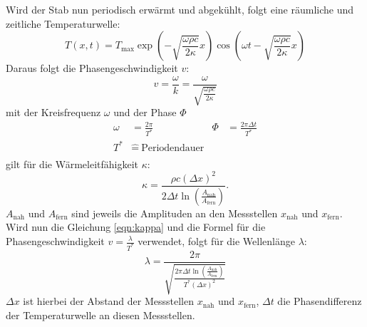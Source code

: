 Wird der Stab nun periodisch erwärmt und abgekühlt, folgt eine räumliche und zeitliche Temperaturwelle:
\begin{equation*}\label{eqn:Tempwelle}
    T(x,t) = T_\text{max} \exp(-\sqrt{\frac{\omega \rho c}{2\kappa}}x)\cos(\omega t - \sqrt{\frac{\omega \rho c}{2\kappa}}x)
\end{equation*}
Daraus folgt die Phasengeschwindigkeit $v$:
\begin{equation*}
    v = \frac{\omega}{k} 
    = \frac{\omega}{\sqrt{\frac{\omega \rho c}{2\kappa}}}
\end{equation*}
mit der Kreisfrequenz $\omega$ und der Phase $\Phi$
\begin{align*}
    \omega     &= \frac{2\pi}{T^*}   &  \Phi      &= \frac{2\pi \Delta t}{T^*} \\
    T^* &\widehat{=} \: \text{Periodendauer}\\
\end{align*}
gilt für die Wärmeleitfähigkeit $\kappa$:
\begin{equation}
    \label{eqn:kappa}
    \kappa = \frac{\rho c (\Delta x)^2}{2\Delta t \ln (\frac{A_{\text{nah}}}{A_{\text{fern}}})} .
\end{equation}
$A_{\text{nah}}$ und $A_{\text{fern}}$ sind jeweils die Amplituden an den Messstellen $x_{\text{nah}}$ und $x_{\text{fern}}$.
Wird nun die Gleichung \ref{eqn:kappa} und die Formel für die Phasengeschwindigkeit $v = \frac{\lambda}{T^*}$ verwendet, 
folgt für die Wellenlänge $\lambda$:
\begin{equation}
    \label{eqn:lambda}
    \lambda = \frac{2\pi}{\sqrt{\frac{2 \pi \Delta t \ln(\frac{A_{\text{nah}}}{A_{\text{fern}}})}{T^* (\Delta x)^2}}}
\end{equation}
$\Delta x$ ist hierbei der Abstand der Messstellen $x_{\text{nah}}$ und $x_{\text{fern}}$, $\Delta t$ die Phasendifferenz der Temperaturwelle an diesen Messstellen.
